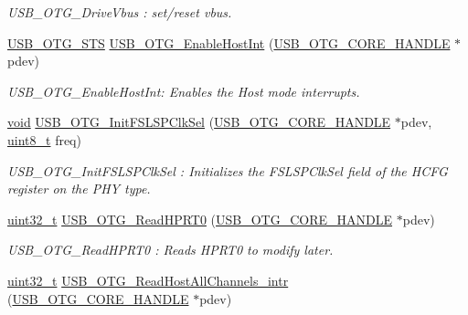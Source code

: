 \begin{DoxyCompactItemize}
\begin{DoxyCompactList}\small\item\em U\-S\-B\-\_\-\-O\-T\-G\-\_\-\-Drive\-Vbus \-: set/reset vbus. \end{DoxyCompactList}\item 
\hyperlink{group___u_s_b___c_o_r_e___exported___types_ga8b6504b9af0662f17515795db0f9c8ed}{U\-S\-B\-\_\-\-O\-T\-G\-\_\-\-S\-T\-S} \hyperlink{group___u_s_b___c_o_r_e___private___functions_gae8de6d34855038ccdb66b7336e9a3020}{U\-S\-B\-\_\-\-O\-T\-G\-\_\-\-Enable\-Host\-Int} (\hyperlink{group___u_s_b___c_o_r_e___exported___types_gaf76054c11eb8a3367907aad7ae700e80}{U\-S\-B\-\_\-\-O\-T\-G\-\_\-\-C\-O\-R\-E\-\_\-\-H\-A\-N\-D\-L\-E} $\ast$pdev)
\begin{DoxyCompactList}\small\item\em U\-S\-B\-\_\-\-O\-T\-G\-\_\-\-Enable\-Host\-Int\-: Enables the Host mode interrupts. \end{DoxyCompactList}\item 
\hyperlink{group___n_a_m_e_ga18028b8badbf1ea7e704ccac3c488e82}{void} \hyperlink{group___u_s_b___c_o_r_e___private___functions_ga20cd8b4154b178264dd822c2f8e7f7ea}{U\-S\-B\-\_\-\-O\-T\-G\-\_\-\-Init\-F\-S\-L\-S\-P\-Clk\-Sel} (\hyperlink{group___u_s_b___c_o_r_e___exported___types_gaf76054c11eb8a3367907aad7ae700e80}{U\-S\-B\-\_\-\-O\-T\-G\-\_\-\-C\-O\-R\-E\-\_\-\-H\-A\-N\-D\-L\-E} $\ast$pdev, \hyperlink{stdint_8h_aba7bc1797add20fe3efdf37ced1182c5}{uint8\-\_\-t} freq)
\begin{DoxyCompactList}\small\item\em U\-S\-B\-\_\-\-O\-T\-G\-\_\-\-Init\-F\-S\-L\-S\-P\-Clk\-Sel \-: Initializes the F\-S\-L\-S\-P\-Clk\-Sel field of the H\-C\-F\-G register on the P\-H\-Y type. \end{DoxyCompactList}\item 
\hyperlink{stdint_8h_a435d1572bf3f880d55459d9805097f62}{uint32\-\_\-t} \hyperlink{group___u_s_b___c_o_r_e___private___functions_ga6d0d78bdf0ffcfd2c6230cd4b3f9a776}{U\-S\-B\-\_\-\-O\-T\-G\-\_\-\-Read\-H\-P\-R\-T0} (\hyperlink{group___u_s_b___c_o_r_e___exported___types_gaf76054c11eb8a3367907aad7ae700e80}{U\-S\-B\-\_\-\-O\-T\-G\-\_\-\-C\-O\-R\-E\-\_\-\-H\-A\-N\-D\-L\-E} $\ast$pdev)
\begin{DoxyCompactList}\small\item\em U\-S\-B\-\_\-\-O\-T\-G\-\_\-\-Read\-H\-P\-R\-T0 \-: Reads H\-P\-R\-T0 to modify later. \end{DoxyCompactList}\item 
\hyperlink{stdint_8h_a435d1572bf3f880d55459d9805097f62}{uint32\-\_\-t} \hyperlink{group___u_s_b___c_o_r_e___private___functions_ga0113e47b0813a1adc74bdc3af7f5eddc}{U\-S\-B\-\_\-\-O\-T\-G\-\_\-\-Read\-Host\-All\-Channels\-\_\-intr} (\hyperlink{group___u_s_b___c_o_r_e___exported___types_gaf76054c11eb8a3367907aad7ae700e80}{U\-S\-B\-\_\-\-O\-T\-G\-\_\-\-C\-O\-R\-E\-\_\-\-H\-A\-N\-D\-L\-E} $\ast$pdev)

\end{DoxyCompactItemize}
